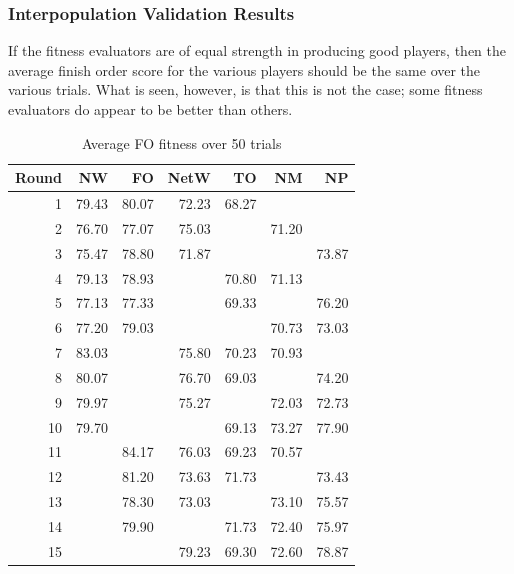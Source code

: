 \subsubsection{Interpopulation Validation Results}

If the fitness evaluators are of equal strength in producing good players, then
the average finish order score for the various players should be the same over
the various trials. What is seen, however, is that this is not the case; some
fitness evaluators do appear to be better than others.

\begin{table}[htbp]
  \centering
  \caption{Average FO fitness over 50 trials}
    \begin{tabular}{rrrrrrr}
    \toprule
    Round & NW    & FO    & NetW  & TO    & NM    & NP \\
    \midrule
    1     & 79.43 & 80.07 & 72.23 & 68.27 &       &  \\
    2     & 76.70 & 77.07 & 75.03 &       & 71.20 &  \\
    3     & 75.47 & 78.80 & 71.87 &       &       & 73.87 \\
    4     & 79.13 & 78.93 &       & 70.80 & 71.13 &  \\
    5     & 77.13 & 77.33 &       & 69.33 &       & 76.20 \\
    6     & 77.20 & 79.03 &       &       & 70.73 & 73.03 \\
    7     & 83.03 &       & 75.80 & 70.23 & 70.93 &  \\
    8     & 80.07 &       & 76.70 & 69.03 &       & 74.20 \\
    9     & 79.97 &       & 75.27 &       & 72.03 & 72.73 \\
    10    & 79.70 &       &       & 69.13 & 73.27 & 77.90 \\
    11    &       & 84.17 & 76.03 & 69.23 & 70.57 &  \\
    12    &       & 81.20 & 73.63 & 71.73 &       & 73.43 \\
    13    &       & 78.30 & 73.03 &       & 73.10 & 75.57 \\
    14    &       & 79.90 &       & 71.73 & 72.40 & 75.97 \\
    15    &       &       & 79.23 & 69.30 & 72.60 & 78.87 \\
    \bottomrule
    \end{tabular}%
  \label{tab:interpop_avgfitness}%
\end{table}%

